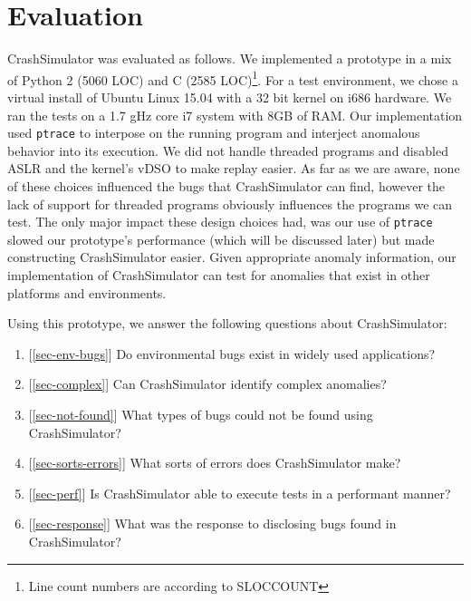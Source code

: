\section{Evaluation}




CrashSimulator was evaluated as follows.
We implemented a prototype in a mix of Python 2 (5060 LOC) and C (2585 
LOC)\footnote{ Line count numbers are according to SLOCCOUNT\cite{SLOCCOUNT}}.  
For a test
environment, we chose a virtual install of Ubuntu Linux 15.04 with a 32 bit 
kernel on i686 hardware.
We ran the tests on a 1.7 gHz core i7 system with 8GB of RAM. Our
implementation used {\tt ptrace} to interpose on the running program and
interject anomalous behavior into its execution.
We did not handle threaded programs and disabled ASLR and the kernel's vDSO 
to make replay easier.  As far as we are aware, none of these choices 
influenced the bugs that CrashSimulator can find, however the lack of support
for threaded programs obviously influences the programs we can test.  The 
only major impact these design choices had, was our use of {\tt ptrace} 
slowed our prototype's performance (which will be discussed later) but made
constructing CrashSimulator easier.  Given appropriate anomaly information, 
our implementation of CrashSimulator can
test for anomalies that exist in other platforms and environments.  

Using this prototype, we answer the following questions about CrashSimulator:

\begin{enumerate}
   \item{[\ref{sec-env-bugs}] Do environmental bugs exist in widely used applications?}
   \item{[\ref{sec-complex}] Can CrashSimulator identify complex anomalies?}
   \item{[\ref{sec-not-found}] What types of bugs could not be found using CrashSimulator?}
   \item{[\ref{sec-sorts-errors}] What sorts of errors does CrashSimulator make?}
   \item{[\ref{sec-perf}] Is CrashSimulator able to execute tests in a performant manner?}
   \item{[\ref{sec-response}] What was the response to disclosing bugs found in CrashSimulator?}
\end{enumerate}



